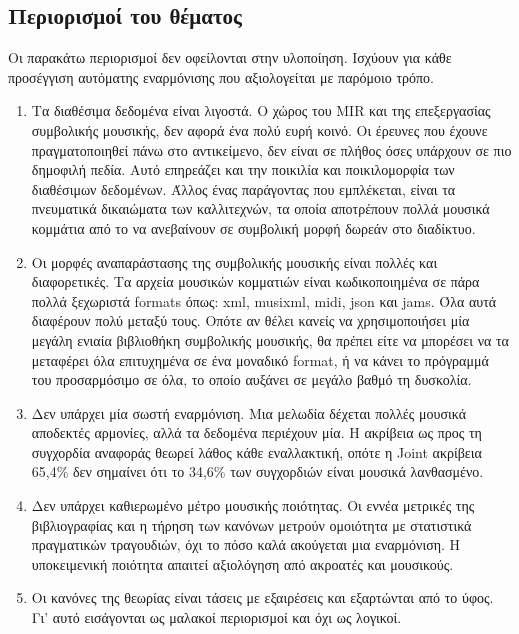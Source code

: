 \subsection{Περιορισμοί του θέματος}
Οι παρακάτω περιορισμοί δεν οφείλονται στην υλοποίηση. Ισχύουν για κάθε προσέγγιση αυτόματης εναρμόνισης που αξιολογείται με παρόμοιο τρόπο.
 \begin{enumerate}
     \item Τα διαθέσιμα δεδομένα είναι λιγοστά. Ο χώρος του MIR και της επεξεργασίας συμβολικής μουσικής, δεν αφορά ένα πολύ ευρή κοινό. Οι έρευνες που έχουνε πραγματοποιηθεί πάνω στο αντικείμενο, δεν είναι σε πλήθος όσες υπάρχουν σε πιο δημοφιλή πεδία. Αυτό επηρεάζει και την ποικιλία και ποικιλομορφία των διαθέσιμων δεδομένων. Άλλος ένας παράγοντας που εμπλέκεται, είναι τα πνευματικά δικαιώματα των καλλιτεχνών, τα οποία αποτρέπουν πολλά μουσικά κομμάτια από το να ανεβαίνουν σε συμβολική μορφή δωρεάν στο διαδίκτυο.
     \item Οι μορφές αναπαράστασης της συμβολικής μουσικής είναι πολλές και διαφορετικές. Τα αρχεία μουσικών κομματιών είναι κωδικοποιημένα σε πάρα πολλά ξεχωριστά formats όπως: xml, musixml, midi, json και jams. Όλα αυτά διαφέρουν πολύ μεταξύ τους. Οπότε αν θέλει κανείς να χρησιμοποιήσει μία μεγάλη ενιαία βιβλιοθήκη συμβολικής μουσικής, θα πρέπει είτε να μπορέσει να τα μεταφέρει όλα επιτυχημένα σε ένα μοναδικό format, ή να κάνει το πρόγραμμά του προσαρμόσιμο σε όλα, το οποίο αυξάνει σε μεγάλο βαθμό τη δυσκολία.
     \item Δεν υπάρχει μία σωστή εναρμόνιση. Μια μελωδία δέχεται πολλές μουσικά αποδεκτές αρμονίες, αλλά τα δεδομένα περιέχουν μία. Η ακρίβεια ως προς τη συγχορδία αναφοράς θεωρεί λάθος κάθε εναλλακτική, οπότε η Joint ακρίβεια 65,4\% δεν σημαίνει ότι το 34,6\% των συγχορδιών είναι μουσικά λανθασμένο.
     \item Δεν υπάρχει καθιερωμένο μέτρο μουσικής ποιότητας. Οι εννέα μετρικές της βιβλιογραφίας και η τήρηση των κανόνων μετρούν ομοιότητα με στατιστικά πραγματικών τραγουδιών, όχι το πόσο καλά ακούγεται μια εναρμόνιση. Η υποκειμενική ποιότητα απαιτεί αξιολόγηση από ακροατές και μουσικούς.
     \item Οι κανόνες της θεωρίας είναι τάσεις με εξαιρέσεις και εξαρτώνται από το ύφος. Γι' αυτό εισάγονται ως μαλακοί περιορισμοί και όχι ως λογικοί. 
 \end{enumerate}

